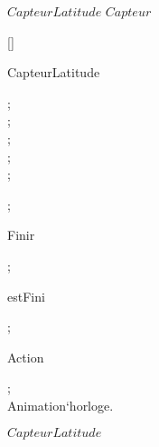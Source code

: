\kClass $CapteurLatitude$ \kISO $Capteur$
\par
\kInstanceVarDef
\parlinebr
\begin{insvar}
[{\False }]
\end{insvar}
\par
\kOperations
{}\begin{op}[e]{CapteurLatitude}%
\signature{\Nat  \Mult Controleur`typeActeur \Mult \mapof{\Nat \Gmap \Int } \Mult Contexte \Mult \Natone  \Mult \Bool  \Oto CapteurLatitude}
\begin{blockstmt}
 ; \\
 ; \\
 ; \\
 ; \\
 ; \\
\end{blockstmt};
\end{op}
\begin{op}[e]{Finir}%
\signature{() \Oto ()}
\parms{}
;
\end{op}
\begin{op}[e]{estFini}%
\signature{() \Oto ()}
\parms{}
\Skip ;
\end{op}
\begin{op}[e]{Action}%
\signature{() \Oto ()}
\parms{}
\begin{blockstmt}
\end{blockstmt}
\end{op}
\kThreadDef
\begin{thread}
\begin{while}{\True }
\begin{blockstmt}
 ; \\
Animation`horloge.
\end{blockstmt}
\end{while}
\end{thread}
\kSync
{}
\kEnd $CapteurLatitude$

